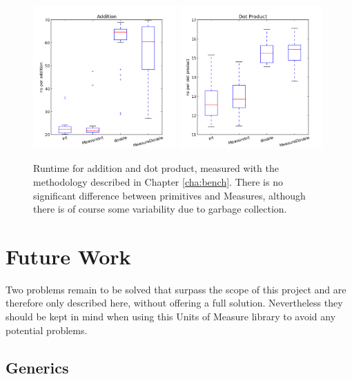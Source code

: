 \documentclass[12pt,oneside,a4paper]{scrbook}
\begin{document}
\begin{figure}[htb]
\centering
\includegraphics[width=0.49\textwidth]{boxplot_add.png}
\includegraphics[width=0.49\textwidth]{boxplot_mul.png}
\caption{Runtime for addition and dot product, measured with the methodology described in Chapter \ref{cha:bench}. There is no significant difference between primitives and Measures, although there is of course some variability due to garbage collection.}
\label{fig:rome}
\end{figure}




\chapter{Future Work}
\label{cha:future}

Two problems remain to be solved that surpass the scope of this project and are therefore only described here, without offering a full solution. Nevertheless they should be kept in mind when using this Units of Measure library to avoid any potential problems.

\section{Generics}
\end{document}
